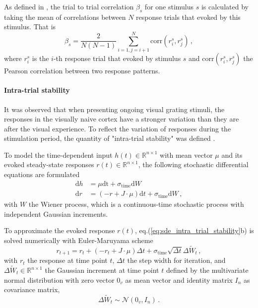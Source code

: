 \documentclass[11pt]{article}
\begin{document}
{	As defined in \cite{tragenap2023nature}, the trial to trial correlation $\beta_s$ for one stimulus $s$ is calculated by taking the mean of correlations between $N$ response trials that evoked by this stimulus. That is
		\begin{equation} \label{eq:ttc_sym}
			\beta_s = \frac{2}{N(N-1)} \sum_{i = 1, j = i+1}^{N} \text{corr}(r_i^s, r_j^s) \, ,
		\end{equation}
	where $r_i^s$ is the $i$-th response trial that evoked by stimulus $s$ and $\text{corr}(r_i^s, r_j^s)$ the Pearson correlation between two response patterns. 
	
	\paragraph{Intra-trial stability}
	
	It was observed that when presenting ongoing visual grating stimuli, the responses in the visually naive cortex have a stronger variation than they are after the visual experience. To reflect the variation of responses during the stimulation period, the quantity of "intra-trial stability" was defined \cite{tragenap2023nature}. 
	
	To model the time-dependent input $h(t) \in \mathbb{R}^{n \times 1}$ with mean vector $\mu$ and its evoked steady-state responses $r(t) \in \mathbb{R}^{n \times 1}$, the following stochastic differential equations are formulated
		\begin{subequations} \label{eq:sde_intra_trial_stability}
			\begin{align}
				\mathrm{d} h & = \mu \mathrm{dt} + \sigma_{\text{time}} \mathrm{d} W \\
				\mathrm{d} r & = (-r + J \cdot \mu) \mathrm{d}t + \sigma_{\text{time}} \mathrm{d} W \, ,
			\end{align}
		\end{subequations}
	with $W$ the Wiener process, which is a continuous-time stochastic process with independent Gaussian increments. 
	
	To approximate the evoked response $r(t)$, eq.(\ref{eq:sde_intra_trial_stability}b) is solved numerically with Euler-Maruyama scheme 
		\begin{equation} \label{eq:euler_maruyama}
			r_{t+1} = r_t + (-r_t + J \cdot \mu) \Delta t + \sigma_{\text{time}} \sqrt{\Delta t} \Delta \tilde{W}_t \, ,
		\end{equation}
	with $r_t$ the response at time point $t$, $\Delta t$ the step width for iteration, and $\Delta \tilde{W}_t \in \mathbb{R}^{n \times 1}$ the Gaussian increment at time point $t$ defined by the multivariate normal distribution with zero vector $0_v$ as mean vector and identity matrix $I_n$ as covariance matrix, 
		\begin{equation}
			\Delta \tilde{W}_t \sim \mathcal{N}(0_v, I_n) \, .
		\end{equation}
	
}
\end{document}
